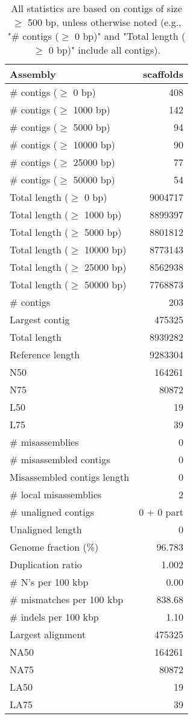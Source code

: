 \documentclass[12pt,a4paper]{article}
\begin{document}
\begin{table}[ht]
\begin{center}
\caption{All statistics are based on contigs of size $\geq$ 500 bp, unless otherwise noted (e.g., "\# contigs ($\geq$ 0 bp)" and "Total length ($\geq$ 0 bp)" include all contigs).}
\begin{tabular}{|l*{1}{|r}|}
\hline
Assembly & scaffolds \\ \hline
\# contigs ($\geq$ 0 bp) & 408 \\ \hline
\# contigs ($\geq$ 1000 bp) & 142 \\ \hline
\# contigs ($\geq$ 5000 bp) & 94 \\ \hline
\# contigs ($\geq$ 10000 bp) & 90 \\ \hline
\# contigs ($\geq$ 25000 bp) & 77 \\ \hline
\# contigs ($\geq$ 50000 bp) & 54 \\ \hline
Total length ($\geq$ 0 bp) & 9004717 \\ \hline
Total length ($\geq$ 1000 bp) & 8899397 \\ \hline
Total length ($\geq$ 5000 bp) & 8801812 \\ \hline
Total length ($\geq$ 10000 bp) & 8773143 \\ \hline
Total length ($\geq$ 25000 bp) & 8562938 \\ \hline
Total length ($\geq$ 50000 bp) & 7768873 \\ \hline
\# contigs & 203 \\ \hline
Largest contig & 475325 \\ \hline
Total length & 8939282 \\ \hline
Reference length & 9283304 \\ \hline
N50 & 164261 \\ \hline
N75 & 80872 \\ \hline
L50 & 19 \\ \hline
L75 & 39 \\ \hline
\# misassemblies & 0 \\ \hline
\# misassembled contigs & 0 \\ \hline
Misassembled contigs length & 0 \\ \hline
\# local misassemblies & 2 \\ \hline
\# unaligned contigs & 0 + 0 part \\ \hline
Unaligned length & 0 \\ \hline
Genome fraction (\%) & 96.783 \\ \hline
Duplication ratio & 1.002 \\ \hline
\# N's per 100 kbp & 0.00 \\ \hline
\# mismatches per 100 kbp & 838.68 \\ \hline
\# indels per 100 kbp & 1.10 \\ \hline
Largest alignment & 475325 \\ \hline
NA50 & 164261 \\ \hline
NA75 & 80872 \\ \hline
LA50 & 19 \\ \hline
LA75 & 39 \\ \hline
\end{tabular}
\end{center}
\end{table}
\end{document}

